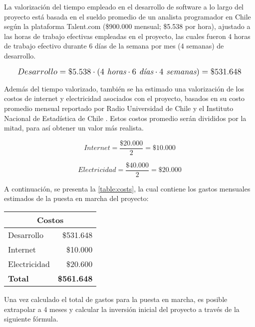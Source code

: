 La valorización del tiempo empleado en el desarrollo de software a lo largo del proyecto está basada en el sueldo promedio de un analista programador en Chile según la plataforma Talent.com \cite{talent} (\$900.000 mensual; \$5.538 por hora), ajustado a las horas de trabajo efectivas empleadas en el proyecto, las cuales fueron 4 horas de trabajo efectivo durante 6 días de la semana por mes (4 semanas) de desarrollo.

\[
\mathlarger{
	Desarrollo = \$5.538 \cdot \left(4 \textit{ horas}\cdot6 \textit{ días}\cdot4 \textit{ semanas}\right) = \$531.648
}
\]

Además del tiempo valorizado, también se ha estimado una valorización de los costos de internet y electricidad asociados con el proyecto, basados en su costo promedio mensual reportado por Radio Universidad de Chile \cite{radiouchile} y el Instituto Nacional de Estadística de Chile \cite{ine}. Estos costos promedio serán divididos por la mitad, para así obtener un valor más realista.

\[
	Internet = \frac{\$20.000}{2} = \$10.000
\]

\[
	Electricidad = \frac{\$40.000}{2} = \$20.000
\]

A continuación, se presenta la \autoref{table:costs}, la cual contiene los gastos mensuales estimados de la puesta en marcha del proyecto:

\begin{center}
	\begin{tabular}{ | p{5cm} | p{5cm} | }
		\hline
    \multicolumn{2}{|c|}{\textbf{Costos}} \\
		\hline
		{Desarrollo} & \multicolumn{1}{|r|}{\$531.648} \\ \hline
		
		{Internet} & \multicolumn{1}{|r|}{\$10.000} \\ \hline
		
		{Electricidad} & \multicolumn{1}{|r|}{\$20.600} \\ \hline
    
    {\textbf{Total}} & \multicolumn{1}{|r|}{\textbf{\$561.648}} \\ \hline
	\end{tabular}

  \label{table:costs}
\end{center}

Una vez calculado el total de gastos para la puesta en marcha, es posible extrapolar a 4 meses y calcular la inversión inicial del proyecto a través de la siguiente fórmula.

